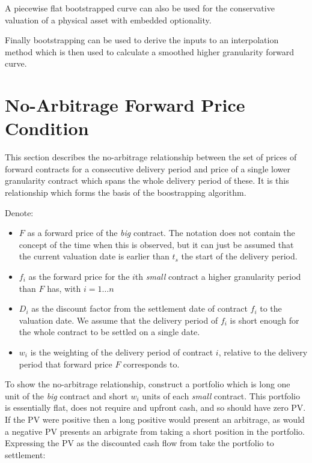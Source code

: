 \documentclass{article}
\begin{document}
A piecewise flat bootstrapped curve can also be used for the conservative valuation
of a physical asset with embedded optionality.


Finally bootstrapping can be used to derive the inputs to an interpolation method which
is then used to calculate a smoothed higher granularity forward curve.

\section{No-Arbitrage Forward Price Condition}
This section describes the no-arbitrage relationship between the set of prices of forward contracts
for a consecutive delivery period and price of a single lower granularity contract which spans 
the whole delivery period of these. It is this relationship which forms the basis of the boostrapping
algorithm.

Denote:
\begin{itemize}
    \item $F$ as a forward price of the \emph{big} contract.
    The notation does not contain the concept of the
    time when this is observed, but it can just be assumed that the current valuation 
    date is earlier than $t_s$ the start of the delivery period.
    \item $f_i$ as the forward price for the $i$th \emph{small} contract a higher granularity 
    period than $F$ has, with $i=1\dots n$
    \item $D_i$ as the discount factor from the settlement date of contract $f_i$ to the 
    valuation date. We assume that the delivery period of $f_i$ is short enough for 
    the whole contract to be settled on a single date.
    \item $w_i$ is the weighting of the delivery period of contract $i$, relative to
    the delivery period that forward price $F$ corresponds to.
\end{itemize}

To show the no-arbitrage relationship, construct a portfolio which is long one unit of the 
\emph{big} contract and short $w_i$ units of each \emph{small} contract. This portfolio
is essentially flat, does not require and upfront cash, and so should have zero PV. If
the PV were positive then a long positive would present an arbitrage, as would a 
negative PV presents an arbigrate from taking a short position in the portfolio.
Expressing the PV as the discounted cash flow from take the portfolio to settlement:
\end{document}
